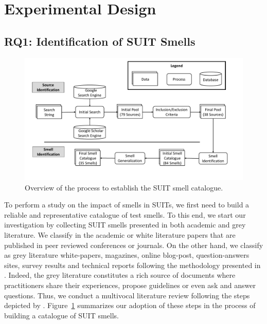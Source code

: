\section{Experimental Design}
\label{sec:methodology}

\subsection{RQ1: Identification of SUIT Smells}
\label{sec:experience-design-smells-collection}
%
\begin{figure}
\centering
\includegraphics[width=\linewidth]{figures/smells/smell-catalgogue-process.pdf}
\caption{Overview of the process to establish the SUIT smell catalogue.}  
\label{fig:smell-catalogue-process}
\end{figure}

To perform a study on the impact of smells in SUITs, we first need to build a reliable and representative catalogue of test smells. To this end, we start our investigation by collecting SUIT smells presented in both academic and grey literature. 
We classify in the academic or white literature papers that are published in peer reviewed conferences or journals. On the other hand, we classify as grey literature white-papers, magazines, online blog-post, question-answers sites, survey results and technical reports following the methodology presented in \textcite{Ricca2021}. Indeed, the grey literature constitutes a rich source of documents where practitioners share their experiences, propose guidelines or even ask and answer questions. Thus, we conduct a multivocal literature review following the steps depicted by \textcite{Garousi2018}. 
Figure~\ref{fig:smell-catalogue-process} summarizes our adoption of these steps in the process of building a catalogue of SUIT smells.

